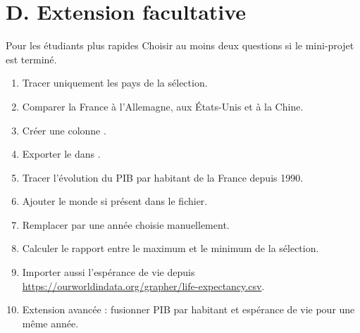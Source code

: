 \documentclass[11pt,a4paper]{article}
\begin{document}
\section*{D. Extension facultative}

\begin{extensionexercise}{Pour les étudiants plus rapides}
Choisir au moins deux questions si le mini-projet est terminé.
\begin{enumerate}
  \item Tracer uniquement les pays de la sélection.
  \item Comparer la France à l'Allemagne, aux États-Unis et à la Chine.
  \item Créer une colonne .
  \item Exporter le  dans .
  \item Tracer l'évolution du PIB par habitant de la France depuis 1990.
  \item Ajouter le monde  si présent dans le fichier.
  \item Remplacer  par une année choisie manuellement.
  \item Calculer le rapport entre le maximum et le minimum de la sélection.
  \item Importer aussi l'espérance de vie depuis \url{https://ourworldindata.org/grapher/life-expectancy.csv}.
  \item Extension avancée : fusionner PIB par habitant et espérance de vie pour une même année.
\end{enumerate}
\end{extensionexercise}
\end{document}
